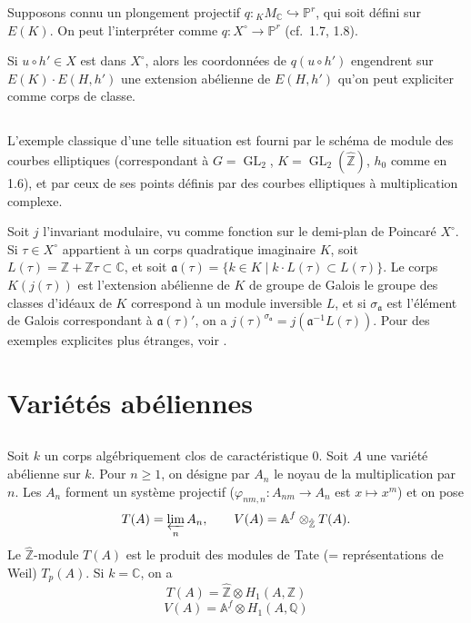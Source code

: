 \documentclass[11pt]{amsart}
\theoremstyle{plain}
\theoremstyle{definition}
\DeclareMathOperator{\GL}{GL}
\newcommand{\ZZ}{\mathbb{Z}}
\newcommand{\QQ}{\mathbb{Q}}
\newcommand{\CC}{\mathbb{C}}
\newcommand{\PP}{\mathbb{P}}
\newcommand{\AAf}{\mathbb{A}^f}
\newcommand{\MC}{M_{\mathbb{C}}}
\begin{document}
Supposons connu un plongement projectif $q : {}_K \MC \hookrightarrow \PP^r$, qui soit d\'efini sur $E(K)$. On peut l'interpr\'eter comme $q : X^\circ \to \PP^r$ (cf.\ 1.7, 1.8).

Si $u \circ h' \in X$ est dans $X^\circ$, alors les coordonn\'ees de $q(u \circ h')$ engendrent sur $E(K) \cdot E(H,h')$ une extension ab\'elienne de $E(H,h')$ qu'on peut expliciter comme corps de classe.

\subsection{}

L'exemple classique d'une telle situation est fourni par le sch\'ema de module des courbes elliptiques (correspondant \`a $G = \GL_2$, $K = \GL_2(\hat{\ZZ})$, $h_0$ comme en 1.6), et par ceux de ses points d\'efinis par des courbes elliptiques \`a multiplication complexe.

Soit $j$ l'invariant modulaire, vu comme fonction sur le demi-plan de Poincar\'e $X^\circ$. Si $\tau \in X^\circ$ appartient \`a un corps quadratique imaginaire $K$, soit $L(\tau) = \ZZ + \ZZ \tau \subset \CC$, et soit $\mathfrak{a}(\tau) = \{k \in K \mid k \cdot L(\tau) \subset L(\tau)\}$. Le corps $K(j(\tau))$ est l'extension ab\'elienne de $K$ de groupe de Galois le groupe des classes d'id\'eaux de $K$ correspond \`a un module inversible $L$, et si $\sigma_{\mathfrak{a}}$ est l'\'el\'ement de Galois correspondant \`a $\mathfrak{a}(\tau)'$, on a $j(\tau)^{\sigma_{\mathfrak{a}}} = j(\mathfrak{a}^{-1} L(\tau))$. Pour des exemples explicites plus \'etranges, voir \cite[page 45--46]{Sh6}.



\section{Vari\'et\'es ab\'eliennes}

\subsection{}

Soit $k$ un corps alg\'ebriquement clos de caract\'eristique $0$. Soit $A$ une vari\'et\'e ab\'elienne sur $k$. Pour $n \geq 1$, on d\'esigne par $A_n$ le noyau de la multiplication par $n$. Les $A_n$ forment un syst\`eme projectif ($\varphi_{nm,n} : A_{nm} \to A_n$ est $x \mapsto x^m$) et on pose
\[
T(A) = \varprojlim_n A_n, \qquad V(A) = \AAf \otimes_{\hat{\ZZ}} T(A).
\]
Le $\hat{\ZZ}$-module $T(A)$ est le produit des modules de Tate (= repr\'esentations de Weil) $T_p(A)$. Si $k = \CC$, on a
\begin{equation}\label{eq:4.1.1}
T(A) = \hat{\ZZ} \otimes H_1(A, \ZZ)
\end{equation}
\begin{equation}\label{eq:4.1.2}
V(A) = \AAf \otimes H_1(A, \QQ)
\end{equation}
\end{document}
